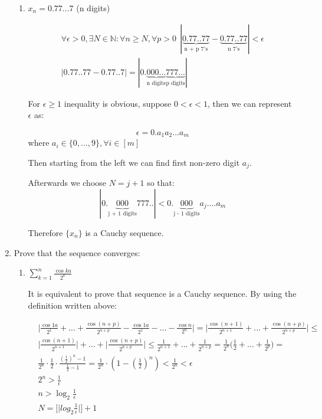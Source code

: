 \documentclass{article}
\begin{document}
\begin{enumerate}
\begin{enumerate}
\item $x_n = 0.77...7$ (n digits)

\begin{align*}
\forall \epsilon > 0, \exists N \in \mathbb{N}: \forall n \geq N, \forall p > 0 \:\: |\underbrace{0.77..77}_\text{n + p 7's} - \underbrace{0.77..77}_\text{n 7's}| < \epsilon\\
|0.77..77 - 0.77..7| = |0.\underbrace{000...}_\text{n digits}\underbrace{777...}_\text{p digits}|
\end{align*}

For $\epsilon \geq 1$ inequality is obvious, suppose $0 < \epsilon < 1$, then we can represent $\epsilon$ as:

\[\epsilon = 0.a_{1}a_{2}...a_{m}\] where $a_i \in \{0, ..., 9\}, \forall i \in [m]$

Then starting from the left we can find first non-zero digit $a_j$. 

Afterwards we choose $N = j + 1$ so that:
\[|0.\underbrace{000}_\text{j + 1 digits}777..| < 0.\underbrace{000}_\text{j - 1 digits}a_j....a_m\]

Therefore $\{x_n\}$ is a Cauchy sequence.

\end{enumerate}

\item Prove that the sequence converges:
\begin{enumerate}
\item $\sum_{k = 1}^n \frac{\cos{ka}}{2^k}$

It is equivalent to prove that sequence is a Cauchy sequence. By using the definition written above:

\begin{align*}
&\bigg|\frac{\cos{1a}}{2^1} + ... + \frac{\cos{(n + p)}}{2^{n+p}} - \frac{\cos{1a}}{2^1} - ... - \frac{\cos{n}}{2^n}\bigg| = \bigg|\frac{\cos{(n + 1)}}{2^{n+1}} + ... + \frac{\cos{(n + p)}}{2^{n+p}}\bigg| \leq\\
&\bigg|\frac{\cos{(n + 1)}}{2^{n+1}}\bigg| + ... + \bigg|\frac{\cos{(n + p)}}{2^{n+p}}\bigg| \leq \frac{1}{2^{n+1}} + ... + \frac{1}{2^{n+p}} = \frac{1}{2^n} \bigg(\frac{1}{2} + ... + \frac{1}{2^p}\bigg) =\\
&\frac{1}{2^n} \cdot \frac{1}{2} \cdot \frac{(\frac{1}{2})^n - 1}{\frac{1}{2} - 1} = \frac{1}{2^n} \cdot (1 - (\frac{1}{2})^n) < \frac{1}{2^n} < \epsilon\\
&2^n > \frac{1}{\epsilon}\\
&n > \log_2{\frac{1}{\epsilon}}\\
&N = \bigg[\bigg|log_2{\frac{1}{\epsilon}}\bigg|\bigg] + 1
\end{align*}

\end{enumerate}

\end{enumerate}
\end{document}
